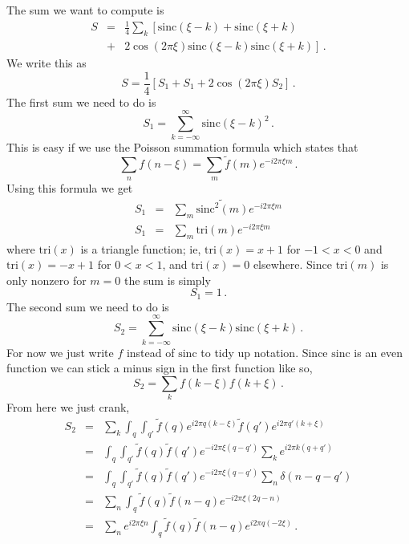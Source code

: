 
The sum we want to compute is\begin{eqnarray*}
  S
  & = & \frac{1}{4}\sum_{k}\left[\textrm{sinc}(\xi-k)+\textrm{sinc}(\xi+k)\right.\\
  & + & \left.2\cos(2\pi\xi)\textrm{sinc}(\xi-k)\textrm{sinc}(\xi+k)\right]
  \, .
\end{eqnarray*}
We write this as
\begin{equation*}
  S=\frac{1}{4}\left[S_{1}+S_{1}+2\cos(2\pi\xi)S_{2}\right]
  \, .
\end{equation*}
The first sum we need to do is
\begin{equation*}
  S_1 = \sum_{k=-\infty}^{\infty}\textrm{sinc}(\xi-k)^{2}
  \, .
\end{equation*}
This is easy if we use the Poisson summation formula which states
that
\begin{equation*}
  \sum_{n}f(n-\xi)=\sum_{m}\tilde{f}(m)e^{-i2\pi\xi m}
  \, .
\end{equation*}
Using this formula we get
\begin{eqnarray*}
  S_{1} & = & \sum_{m}\widetilde{\textrm{sinc}^{2}\left(m\right)}e^{-i2\pi\xi m}\\
  S_{1} & = & \sum_{m}\textrm{tri}(m)e^{-i2\pi\xi m}
\end{eqnarray*}
where $\textrm{tri}(x)$ is a triangle function; ie, $\textrm{tri}(x)=x+1$ for $-1<x<0$ and $\textrm{tri}(x)=-x+1$ for $0<x<1$, and $\textrm{tri}(x)=0$ elsewhere.
Since $\textrm{tri}(m)$ is only nonzero for $m=0$ the sum is simply
\begin{equation*}
  S_1 = 1
  \, .
\end{equation*}
The second sum we need to do is
\begin{equation*}
  S_2 = \sum_{k=-\infty}^{\infty}\textrm{sinc}(\xi-k)\textrm{sinc}(\xi+k)
  \, .
\end{equation*}
For now we just write $f$ instead of $\textrm{sinc}$ to tidy up notation.
Since $\textrm{sinc}$ is an even function we can stick a minus sign in the first function like so,
\begin{equation*}
  S_2 = \sum_{k}f(k-\xi)f(k+\xi)
  \, .
\end{equation*}
From here we just crank,\begin{eqnarray*}
  S_2
  & = & \sum_{k}\int_{q}\int_{q'}\tilde{f}(q)e^{i2\pi q(k-\xi)}\tilde{f}(q')e^{i2\pi q'(k+\xi)}\\
  & = & \int_{q}\int_{q'}\tilde{f}(q)\tilde{f}(q')e^{-i2\pi\xi(q-q')}\sum_{k}e^{i2\pi k(q+q')}\\
  & = & \int_{q}\int_{q'}\tilde{f}(q)\tilde{f}(q')e^{-i2\pi\xi(q-q')}\sum_{n}\delta(n-q-q')\\
  & = & \sum_{n}\int_{q}\tilde{f}(q)\tilde{f}(n-q)e^{-i2\pi\xi(2q-n)}\\
  & = & \sum_{n}e^{i2\pi\xi n}\int_{q}\tilde{f}(q)\tilde{f}(n-q)e^{i2\pi q(-2\xi)}
  \, .
\end{eqnarray*}
